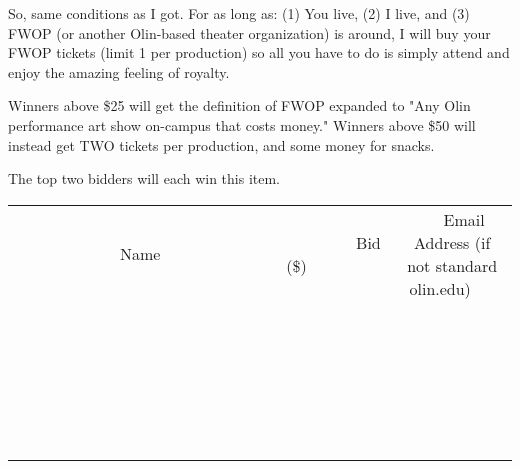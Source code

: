 \documentclass[11pt]{article}
\begin{document}
So, same conditions as I got. For as long as: (1) You live, (2) I live, and (3) FWOP (or another Olin-based theater organization) is around, I will buy your FWOP tickets (limit 1 per production) so all you have to do is simply attend and enjoy the amazing feeling of royalty. 

Winners above \$25 will get the definition of FWOP expanded to "Any Olin performance art show on-campus that costs money." 
Winners above \$50 will instead get TWO tickets per production, and some money for snacks.

The top two bidders will each win this item. \\[6ex]
\begin{tabular}{c c c}
~~~~~~~~~~~~~Name~~~~~~~~~~~~~ & ~~~~~~~~~Bid (\$)~~~~~~~~~ & ~~~Email Address (if not standard olin.edu)~~~ \\
 & & \\
\hline
 & & \\
\hline
 & & \\
\hline
 & & \\
\hline
 & & \\
\hline
 & & \\
\hline
 & & \\
\hline
 & & \\
\hline
 & & \\
\hline
 & & \\
\hline
 & & \\
\hline
 & & \\
\hline
 & & \\
\hline
 & & \\
\hline
 & & \\
\hline
 & & \\
\hline
 & & \\
\hline
 & & \\
\hline
 & & \\
\hline
 & & \\
\hline
 & & \\
\hline
 & & \\
\hline
 & & \\
\hline
 & & \\
\hline
 & & \\
\hline
 & & \\
\hline
\end{tabular}
\clearpage
\end{document}

